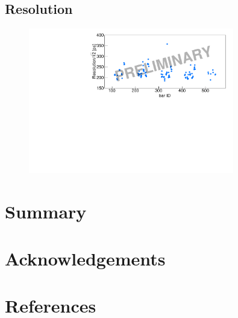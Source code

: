 \documentclass[review]{elsarticle}
\begin{document}
\subsection{Resolution}

\begin{figure}[h!]
\centering
\includegraphics[width=0.8\textwidth]{figures/calibrations/resolutions.pdf}
\caption{}
\end{figure}

\fi


\section{Summary}


\section{Acknowledgements}


\section*{References}


\end{document}

